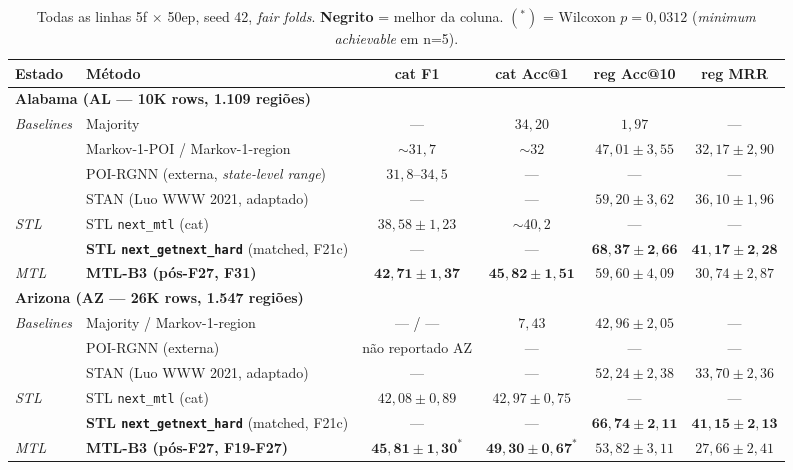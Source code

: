 \documentclass[11pt,a4paper]{article}
\begin{document}
\begin{table}[H]
\centering
\footnotesize
\caption{Todas as linhas 5f $\times$ 50ep, seed 42, \textit{fair folds}. \textbf{Negrito} = melhor da coluna. $(^*)$ = Wilcoxon $p=0{,}0312$ (\textit{minimum achievable} em n=5).}
\renewcommand{\arraystretch}{1.1}
\begin{tabular}{llcccc}
\toprule
\textbf{Estado} & \textbf{Método} & \textbf{cat F1} & \textbf{cat Acc@1} & \textbf{reg Acc@10} & \textbf{reg MRR} \\
\midrule
\multicolumn{6}{l}{\textbf{Alabama (AL --- 10K rows, 1.109 regiões)}} \\
\midrule
\multirow{4}{*}{\textit{Baselines}}
    & Majority & --- & $34{,}20$ & $1{,}97$ & --- \\
    & Markov-1-POI / Markov-1-region & $\sim 31{,}7$ & $\sim 32$ & $47{,}01 \pm 3{,}55$ & $32{,}17 \pm 2{,}90$ \\
    & POI-RGNN (externa, \textit{state-level range}) & $31{,}8$--$34{,}5$ & --- & --- & --- \\
    & STAN (Luo WWW 2021, adaptado) & --- & --- & $59{,}20 \pm 3{,}62$ & $36{,}10 \pm 1{,}96$ \\
\midrule
\multirow{2}{*}{\textit{STL}}
    & STL \texttt{next\_mtl} (cat) & $38{,}58 \pm 1{,}23$ & $\sim 40{,}2$ & --- & --- \\
    & \textbf{STL \texttt{next\_getnext\_hard}} (matched, F21c) & --- & --- & $\mathbf{68{,}37 \pm 2{,}66}$ & $\mathbf{41{,}17 \pm 2{,}28}$ \\
\midrule
\multirow{1}{*}{\textit{MTL}}
    & \textbf{MTL-B3 (pós-F27, F31)} & $\mathbf{42{,}71 \pm 1{,}37}$ & $\mathbf{45{,}82 \pm 1{,}51}$ & $59{,}60 \pm 4{,}09$ & $30{,}74 \pm 2{,}87$ \\
\midrule
\multicolumn{6}{l}{\textbf{Arizona (AZ --- 26K rows, 1.547 regiões)}} \\
\midrule
\multirow{3}{*}{\textit{Baselines}}
    & Majority / Markov-1-region & --- / --- & $7{,}43$ & $42{,}96 \pm 2{,}05$ & --- \\
    & POI-RGNN (externa) & não reportado AZ & --- & --- & --- \\
    & STAN (Luo WWW 2021, adaptado) & --- & --- & $52{,}24 \pm 2{,}38$ & $33{,}70 \pm 2{,}36$ \\
\midrule
\multirow{2}{*}{\textit{STL}}
    & STL \texttt{next\_mtl} (cat) & $42{,}08 \pm 0{,}89$ & $42{,}97 \pm 0{,}75$ & --- & --- \\
    & \textbf{STL \texttt{next\_getnext\_hard}} (matched, F21c) & --- & --- & $\mathbf{66{,}74 \pm 2{,}11}$ & $\mathbf{41{,}15 \pm 2{,}13}$ \\
\midrule
\multirow{1}{*}{\textit{MTL}}
    & \textbf{MTL-B3 (pós-F27, F19-F27)} & $\mathbf{45{,}81 \pm 1{,}30^*}$ & $\mathbf{49{,}30 \pm 0{,}67^*}$ & $53{,}82 \pm 3{,}11$ & $27{,}66 \pm 2{,}41$ \\
\bottomrule
\end{tabular}
\end{table}
\end{document}
